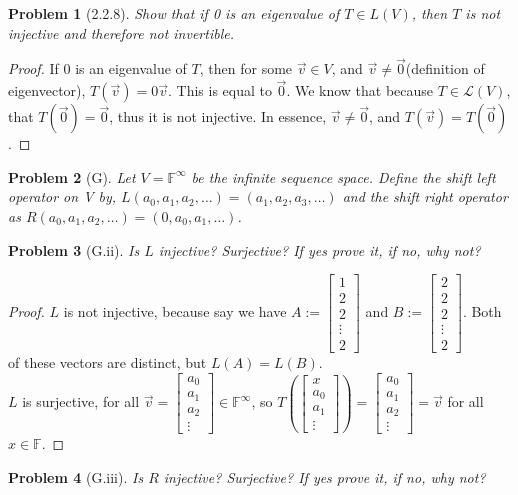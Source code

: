\documentclass[12pt]{article}   %
\newcommand{\F}{\mathbb{F}} %
\renewcommand{\a}{\alpha}
\newtheorem{problem}{Problem}
\begin{document}
\begin{problem}[2.2.8]
Show that if 0 is an eigenvalue of $T\in L(V)$, then $T$ is not injective and therefore not invertible.
\end{problem}
\begin{proof}
If 0 is an eigenvalue of $T$, then for some $\vec{v}\in V$, and $\vec{v}\ne \vec{0}$(definition of eigenvector), $T(\vec{v})=0\vec{v}$. This is equal to $\vec{0}$. We know that because $T\in\mathcal{L}(V)$, that $T(\vec{0})=\vec{0}$, thus it is not injective. In essence, $\vec{v}\ne \vec{0}$, and $T(\vec{v})=T(\vec{0})$.
\end{proof}
\begin{problem}[G]
Let $V=\F^{\infty}$ be the infinite sequence space. Define the shift left operator on V by, $L(a_0,a_1,a_2,\dots)=(a_1, a_2, a_3,\dots)$ and the shift right operator as $R(a_0,a_1,a_2,\dots)=(0,a_0,a_1,\dots)$.
\end{problem}
\begin{problem}[G.ii]
Is $L$ injective? Surjective? If yes prove it, if no, why not?
\end{problem}
\begin{proof}
$L$ is not injective, because say we have $A:=\begin{bmatrix}1\\2\\2\\ \vdots\\2\end{bmatrix}$ and $B:=\begin{bmatrix}2\\2\\2\\ \vdots\\2\end{bmatrix}$. Both of these vectors are distinct, but $L(A)=L(B)$.\\
$L$ is surjective, for all $\vec{v}=\begin{bmatrix}a_0\\a_1\\a_2\\\vdots\end{bmatrix}\in \F^{\infty}$, so $T\left(\begin{bmatrix}x\\a_0\\a_1\\\vdots\end{bmatrix}\right ) =\begin{bmatrix}a_0\\a_1\\a_2\\\vdots\end{bmatrix}= \vec{v}$ for all $x\in\F$.
\end{proof}
\begin{problem}[G.iii]
Is $R$ injective? Surjective? If yes prove it, if no, why not?
\end{problem}
\end{document}
